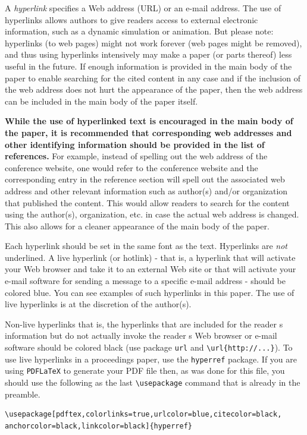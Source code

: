 \documentclass{article}
\begin{document}
A \emph{hyperlink} specifies a Web address (URL) or an e-mail address. The use of hyperlinks allows authors to give readers access to external electronic information, such as a dynamic simulation or animation. 
But please note: hyperlinks (to web pages) might not work forever (web pages might be removed), and thus using hyperlinks intensively may make a paper (or parts thereof) less useful in the future. If enough information is provided in the main body of the paper to enable searching for the cited content in any case and if the inclusion of the web address does not hurt the appearance of the paper, then the web address can be included in the main body of the paper itself.

\textbf{While the use of hyperlinked text is encouraged in the main body of the paper, it is recommended that corresponding web addresses and other identifying information should be provided in the list of references.} For example, instead of spelling out the web address of the conference website, one would refer to the conference website and the corresponding entry in the reference section will spell out the associated web address and other relevant information such as author(s) and/or organization that published the content. This would allow readers to search for the content using the author(s), organization, etc. in case the actual web address is changed. This also allows for a cleaner appearance of the main body of the paper.

Each hyperlink should be set in the same font as the text. Hyperlinks are \emph{not} underlined. A live hyperlink (or hotlink) - that is, a hyperlink that will activate your Web browser and take it to an external Web site or that will activate your e-mail software for sending a message to a specific e-mail address - should be colored blue. You can see examples of such hyperlinks in this paper. The use of live hyperlinks is at the discretion of the author(s).

Non-live hyperlinks that is, the hyperlinks that are included for the reader s information but do not actually invoke the reader s Web browser or e-mail software should be colored black (use package \texttt{url} and \verb+\url{http://...}+). To use live hyperlinks in a proceedings paper, use the \texttt{hyperref} package. If you are using \texttt{PDFLaTeX} to generate your PDF file then, as was done for this file, you should use the following as the last \verb+\usepackage+ command that is already in the preamble.

\begin{verbatim}
\usepackage[pdftex,colorlinks=true,urlcolor=blue,citecolor=black,
anchorcolor=black,linkcolor=black]{hyperref}
\end{verbatim}
\end{document}
